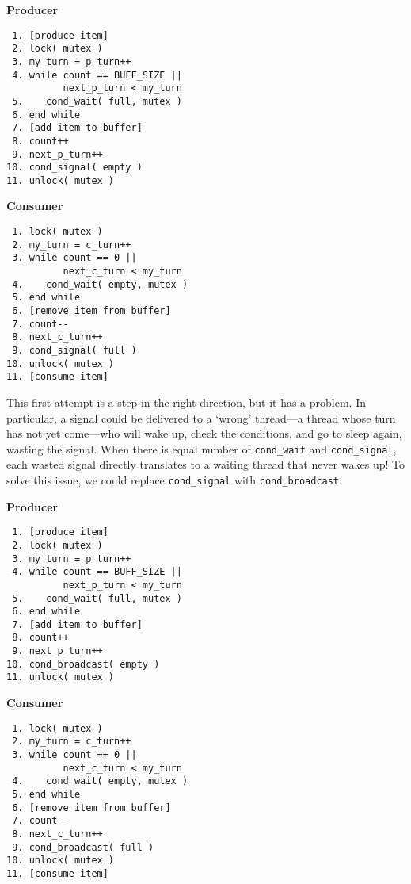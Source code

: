 \begin{multicols}{2}
    \small
    \textbf{Producer}\vspace{-2em}
    \begin{verbatim}
 1. [produce item]
 2. lock( mutex )
 3. my_turn = p_turn++
 4. while count == BUFF_SIZE ||
          next_p_turn < my_turn
 5.    cond_wait( full, mutex )
 6. end while
 7. [add item to buffer]
 8. count++
 9. next_p_turn++
10. cond_signal( empty )
11. unlock( mutex )
    \end{verbatim}
    \columnbreak
    \textbf{Consumer}\vspace{-2em}
    \begin{verbatim}
 1. lock( mutex )
 2. my_turn = c_turn++
 3. while count == 0 ||
          next_c_turn < my_turn
 4.    cond_wait( empty, mutex )
 5. end while
 6. [remove item from buffer]
 7. count--
 8. next_c_turn++
 9. cond_signal( full )
10. unlock( mutex )
11. [consume item]
    \end{verbatim}
\end{multicols}
\vspace{-2em}

This first attempt is a step in the right direction, but it has a problem.
In particular, a signal could be delivered to a `wrong' thread—a thread whose turn has not yet come—who will wake up, check the conditions, and go to sleep again, wasting the signal.
When there is equal number of \texttt{cond\_wait} and \texttt{cond\_signal}, each wasted signal directly translates to a waiting thread that never wakes up!
To solve this issue, we could replace \texttt{cond\_signal} with \texttt{cond\_broadcast}:

\begin{multicols}{2}
    \small
    \textbf{Producer}\vspace{-2em}
    \begin{verbatim}
 1. [produce item]
 2. lock( mutex )
 3. my_turn = p_turn++
 4. while count == BUFF_SIZE ||
          next_p_turn < my_turn
 5.    cond_wait( full, mutex )
 6. end while
 7. [add item to buffer]
 8. count++
 9. next_p_turn++
10. cond_broadcast( empty )
11. unlock( mutex )
    \end{verbatim}
    \columnbreak
    \textbf{Consumer}\vspace{-2em}
    \begin{verbatim}
 1. lock( mutex )
 2. my_turn = c_turn++
 3. while count == 0 ||
          next_c_turn < my_turn
 4.    cond_wait( empty, mutex )
 5. end while
 6. [remove item from buffer]
 7. count--
 8. next_c_turn++
 9. cond_broadcast( full )
10. unlock( mutex )
11. [consume item]
    \end{verbatim}
\end{multicols}
\vspace{-2em}

